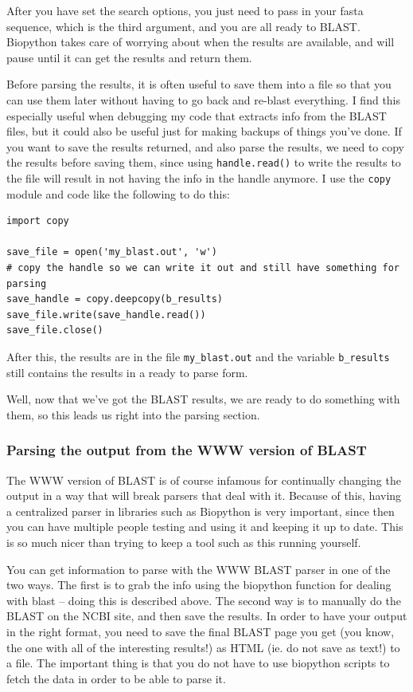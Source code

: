 \documentclass{article}
\begin{document}
After you have set the search options, you just need to pass in your fasta sequence, which is the third argument, and you are all ready to BLAST. Biopython takes care of worrying about when the results are available, and will pause until it can get the results and return them.


Before parsing the results, it is often useful to save them into a file so that you can use them later without having to go back and re-blast everything. I find this especially useful when debugging my code that extracts info from the BLAST files, but it could also be useful just for making backups of things you've done. If you want to save the results returned, and also parse the results, we need to copy the results before saving them, since using \verb|handle.read()| to write the results to the file will result in not having the info in the handle anymore. I use the \verb|copy| module and code like the following to do this:

\begin{verbatim}
import copy

save_file = open('my_blast.out', 'w')
# copy the handle so we can write it out and still have something for parsing
save_handle = copy.deepcopy(b_results)
save_file.write(save_handle.read())
save_file.close()
\end{verbatim}

After this, the results are in the file \verb|my_blast.out| and the variable \verb|b_results| still contains the results in a ready to parse form.


Well, now that we've got the BLAST results, we are ready to do something with them, so this leads us right into the parsing section.

\subsubsection{Parsing the output from the WWW version of BLAST}

The WWW version of BLAST is of course infamous for continually changing the output in a way that will break parsers that deal with it. Because of this, having a centralized parser in libraries such as Biopython is very important, since then you can have multiple people testing and using it and keeping it up to date. This is so much nicer than trying to keep a tool such as this running yourself.


You can get information to parse with the WWW BLAST parser in one of the two ways. The first is to grab the info using the biopython function for dealing with blast -- doing this is described above. The second way is to manually do the BLAST on the NCBI site, and then save the results. In order to have your output in the right format, you need to save the final BLAST page you get (you know, the one with all of the interesting results!) as HTML (ie. do not save as text!) to a file. The important thing is that you do not have to use biopython scripts to fetch the data in order to be able to parse it.
\end{document}
